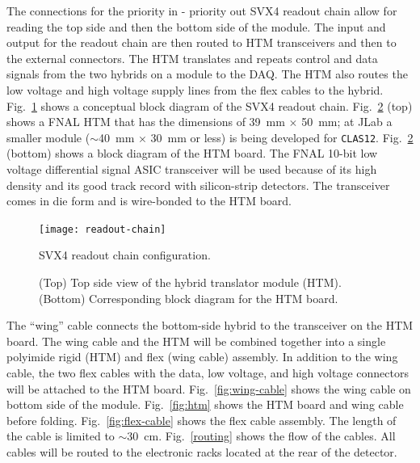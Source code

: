 The connections for the priority in - priority out SVX4 readout chain 
allow for reading the top side and then the bottom side of the module.
The input and output for the readout chain are then routed to HTM 
transceivers and then to the external connectors.  The HTM translates and 
repeats control and data signals from the two hybrids on a module to the 
DAQ.  The HTM also routes the low voltage and high voltage supply lines 
from the flex cables to the hybrid.  Fig.~\ref{fig:readout-chain} shows a 
conceptual block diagram of the SVX4 readout chain.  Fig.~\ref{htm} (top) 
shows a FNAL HTM that has the dimensions of 39~mm $\times$ 50~mm; at JLab 
a smaller module ($\sim$40~mm $\times$ 30~mm or less) is being developed 
for {\tt CLAS12}.  Fig.~\ref{htm} (bottom) shows a block diagram of the 
HTM board.  The FNAL 10-bit low voltage differential signal ASIC 
transceiver will be used because of its high density and its good track 
record with silicon-strip detectors.  The transceiver comes in die form 
and is wire-bonded to the HTM board.

\begin{figure}[htbp]
\centering
\texttt{[image: readout-chain]}
\caption{\small{SVX4 readout chain configuration.}}
\label{fig:readout-chain}
\end{figure}

\begin{figure}[htbp]
\vspace{13.5cm}
\caption{\small{(Top) Top side view of the hybrid translator module (HTM).
(Bottom) Corresponding block diagram for the HTM board.}}
\label{htm}
\end{figure}

The ``wing'' cable connects the bottom-side hybrid to the transceiver on 
the HTM board.  The wing cable and the HTM will be combined together into 
a single polyimide rigid (HTM) and flex (wing cable) assembly.  In addition 
to the wing cable, the two flex cables with the data, low voltage, and high 
voltage connectors will be attached to the HTM board.  
Fig.~\ref{fig:wing-cable} shows the wing cable on bottom side of the module.  
Fig.~\ref{fig:htm} shows the HTM board and wing cable before folding.
Fig.~\ref{fig:flex-cable} shows the flex cable assembly.  The length of 
the cable is limited to $\sim$30~cm.  Fig.~\ref{routing} shows the flow of 
the cables.  All cables will be routed to the electronic racks located at 
the rear of the detector.

